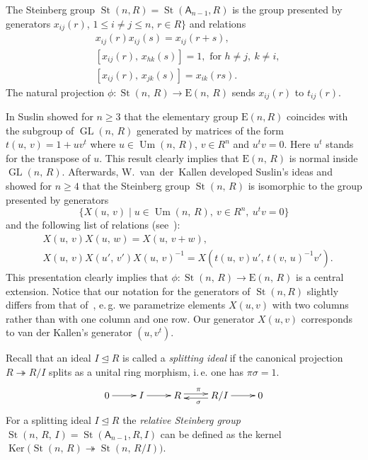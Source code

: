 \documentclass[11pt]{amsart}
\theoremstyle{plain} \declaretheorem[name=Theorem, Refname={Theorem,Theorems}]{tm} \Crefname{tm}{Theorem}{Theorems}
\numberwithin{equation}{section}
\theoremstyle{definition} \newtheorem{df}[lm]{Definition} \Crefname{df}{Definition}{Definitions}
\theoremstyle{remark} \newtheorem{rk}[lm]{Remark} \Crefname{rk}{Remark}{Remarks}
\newcommand{\Ker}{\mathop{\mathrm{Ker}}\nolimits}
\newcommand{\E}{{\mathrm{E}}}
\newcommand{\Um}{\mathop{\mathrm{Um}}\nolimits}
\newcommand{\St}{\mathop{\mathrm{St}}\nolimits}
\newcommand{\GL}{\mathop{\mathrm{GL}}\nolimits}
\newcommand{\epi}{\twoheadrightarrow}
\newcommand{\inv}{^{-1}}
\newcommand{\rA}{\mathsf{A}}
\begin{document}
The Steinberg group $\St(n, R) = \St(\rA_{n-1}, R)$ is the group presented by generators
$x_{ij}(r)$, $1\leq i\neq j\leq n$, $r\in R\}$ and relations
\setcounter{equation}{0}
\renewcommand{\theequation}{S\arabic{equation}}
\begin{align}
&x_{ij}(r)x_{ij}(s)=x_{ij}(r+s), \label{add0}\\
&[x_{ij}(r),\,x_{hk}(s)]=1,\text{ for }h\neq j,\ k\neq i, \label{ccf1}\\
&[x_{ij}(r),\,x_{jk}(s)]=x_{ik}(rs) \label{ccf2}.
\end{align}
The natural projection $\phi\colon\St(n,\,R)\rightarrow\E(n,\,R)$ sends $x_{ij}(r)$ to $t_{ij}(r)$.

In \cite{Sus} Suslin showed for $n\geq 3$ that the elementary group $\E(n, R)$ coincides with the subgroup of $\GL(n,\,R)$ generated by matrices
of the form $t(u,\,v)=1+uv^t$ where $u\in\Um(n,\,R)$, $v\in R^n$ and $u^tv=0$. Here $u^t$ stands for the transpose of $u$.
This result clearly implies that $\E(n,\,R)$ is normal inside $\GL(n,\,R)$.
Afterwards, W.~van~der~Kallen developed Suslin's ideas and showed for $n\geq4$ that the Steinberg group $\St(n,\,R)$ is isomorphic to the group presented by generators
$$\{X(u,\,v)\mid u\in\Um(n,\,R),\ v\in R^n,\ u^tv=0\}$$ and the following list of relations (see~\cite[Theorem~1]{vdK}):
\setcounter{equation}{0} \renewcommand{\theequation}{K\arabic{equation}}
\begin{align}
&X(u,\,v)X(u,\,w)=X(u,\,v+w), \label{add1} \\
&X(u,\,v)X(u',\,v')X(u,\,v)\inv=X(t(u,\,v)u',\,t(v,\,u)\inv v'). \label{conj1}
\end{align}
This presentation clearly implies that $\phi\colon\St(n,\,R)\rightarrow\E(n,\,R)$ is a central extension.
Notice that our notation for the generators of $\St(n, R)$ slightly differs from that of~\cite{vdK}, e.\,g. we parametrize elements $X(u, v)$ with two columns
rather than with one column and one row. Our generator $X(u,v)$ corresponds to van der Kallen's generator $(u, v^t)$.

Recall that an ideal $I\trianglelefteq R$ is called a \emph{splitting ideal} if the canonical projection $R \twoheadrightarrow R/I$ splits as a unital ring morphism, i.\,e. one has $\pi\sigma=1$.
$$\xymatrix{0\ar@<0.1ex>[r]^{}&I\ar@<0.1ex>[r]^{}&R\ar@<0.5ex>[r]^{\pi}&R/I\ar@<0.5ex>[l]^{\sigma}\ar@<0.1ex>[r]^{}&0}$$
For a splitting ideal $I\trianglelefteq R$ the \emph{relative Steinberg group} $\St(n,\,R,\,I) = \St(\rA_{n-1}, R, I)$ can be defined as the kernel $\Ker\big(\St(n,\,R)\epi\St(n,\,R/I)\big)$.
\end{document}
